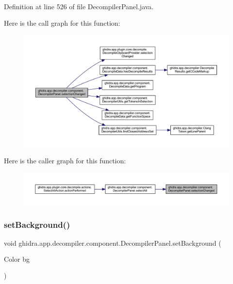 Definition at line 526 of file Decompiler\+Panel.\+java.

Here is the call graph for this function\+:
\nopagebreak
\begin{figure}[H]
\begin{center}
\leavevmode
\includegraphics[width=350pt]{classghidra_1_1app_1_1decompiler_1_1component_1_1_decompiler_panel_abd4a85466441f38db1df00ca36fdb804_cgraph}
\end{center}
\end{figure}
Here is the caller graph for this function\+:
\nopagebreak
\begin{figure}[H]
\begin{center}
\leavevmode
\includegraphics[width=350pt]{classghidra_1_1app_1_1decompiler_1_1component_1_1_decompiler_panel_abd4a85466441f38db1df00ca36fdb804_icgraph}
\end{center}
\end{figure}
\mbox{\label{classghidra_1_1app_1_1decompiler_1_1component_1_1_decompiler_panel_a0ed85871d15e3b2c6b9445b8736119fd}} 
\subsubsection{\texorpdfstring{setBackground()}{setBackground()}}
{\footnotesize\ttfamily void ghidra.\+app.\+decompiler.\+component.\+Decompiler\+Panel.\+set\+Background (\begin{DoxyParamCaption}\item[{Color}]{bg }\end{DoxyParamCaption})\hspace{0.3cm}{\ttfamily [inline]}}



